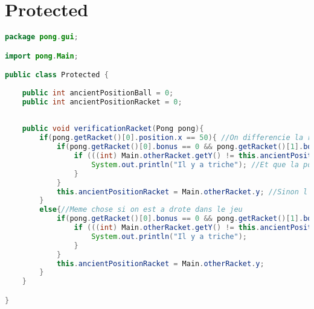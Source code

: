\section{Protected}
\begin{lstlisting}[language=Java]
package pong.gui;

import pong.Main;

public class Protected {
	
	public int ancientPositionBall = 0;
	public int ancientPositionRacket = 0;
	
	
	public void verificationRacket(Pong pong){
		if(pong.getRacket()[0].position.x == 50){ //On differencie la raquette droite de la raquette gauche
			if(pong.getRacket()[0].bonus == 0 && pong.getRacket()[1].bonus == 0){ //Si les bonus ne sont pas active
				if (((int) Main.otherRacket.getY() != this.ancientPositionRacket + Pong.RACKET_SPEED_JG && (int) Main.otherRacket.getY() != this.ancientPositionRacket - Pong.RACKET_SPEED_JG) && (int) Main.otherRacket.getY() != this.ancientPositionRacket){ 
					System.out.println("Il y a triche"); //Et que la position recue pour la raquette adverse ne correspond pas a ce que l'on attendais, il y a triche
				}
			}
			this.ancientPositionRacket = Main.otherRacket.y; //Sinon l'ancienne position de la raquette adverse et retenue pour le calcul suivant
		}
		else{//Meme chose si on est a drote dans le jeu
			if(pong.getRacket()[0].bonus == 0 && pong.getRacket()[1].bonus == 0){ 
				if (((int) Main.otherRacket.getY() != this.ancientPositionRacket + Pong.RACKET_SPEED_JD && (int) Main.otherRacket.getY() != this.ancientPositionRacket - Pong.RACKET_SPEED_JD) && (int) Main.otherRacket.getY() != this.ancientPositionRacket){ 
					System.out.println("Il y a triche"); 
				}
			}
			this.ancientPositionRacket = Main.otherRacket.y; 			
		}
	}

}
\end{lstlisting}